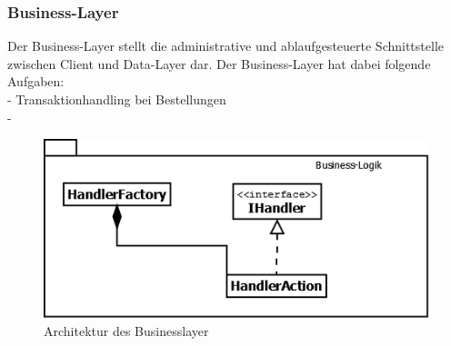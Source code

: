 \subsubsection{Business-Layer}
Der Business-Layer stellt die administrative und ablaufgesteuerte Schnittstelle zwischen Client und Data-Layer dar. Der Business-Layer hat dabei folgende Aufgaben:\\
- Transaktionhandling bei Bestellungen\\
- 

\begin{figure}[H]
	\includegraphics[width=1.0\linewidth]{Images/BusinessLayer-Architektur}
	\caption{Architektur des Businesslayer}
	\label{fig:businesslayer-architektur}
\end{figure}

